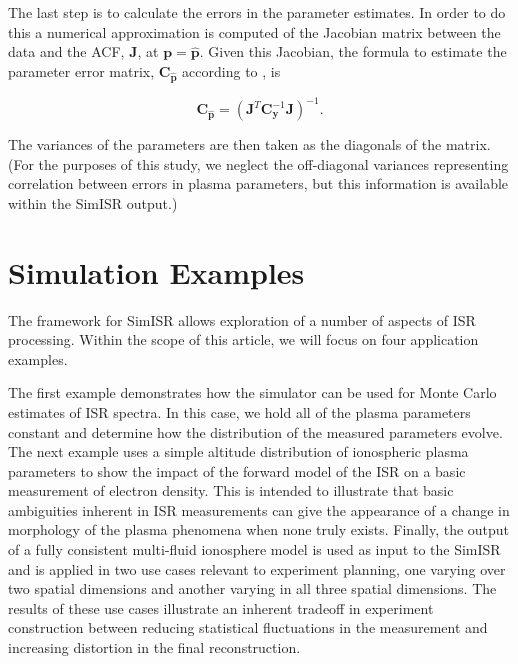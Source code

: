 \documentclass[draft,ras]{agutex}
\begin{document}
\begin{article}
The last step is to calculate the errors in the parameter estimates. In order to do this a numerical approximation is computed of the Jacobian matrix between the data and the ACF, $\mathbf{J}$, at $\mathbf{p}=\mathbf{\hat{p}}$. Given this Jacobian, the formula to estimate the parameter error matrix, $\mathbf{C}_{\mathbf{\hat{p}}}$ according to \citet{Hysell:2000cq}, is


\begin{equation}
\label{eqn:jacinv}
\mathbf{C}_{\mathbf{\hat{p}}}=(\mathbf{J}^T \mathbf{C}_{\mathbf{y}}^{-1}\mathbf{J})^{-1}.
\end{equation}


\noindent  The variances of the parameters are then taken as the diagonals of the matrix.  (For the purposes of this study, we neglect the off-diagonal variances representing correlation between errors in plasma parameters, but this information is available within the SimISR output.)




\section{Simulation Examples}
The framework for SimISR allows exploration of a number of aspects of ISR processing. Within the scope of this article, we will focus on four application examples.

The first example demonstrates how the simulator can be used for Monte Carlo estimates of ISR spectra. In this case, we hold all of the plasma parameters constant and determine how the distribution of the measured parameters evolve. The next example uses a simple altitude distribution of ionospheric plasma parameters to show the impact of the forward model of the ISR on a basic measurement of electron density. This is intended to illustrate that basic ambiguities inherent in ISR measurements can give the appearance of a change in morphology of the plasma phenomena when none truly exists. Finally, the output of a fully consistent multi-fluid ionosphere model is used as input to the SimISR and is applied in two use cases relevant to experiment planning, one varying over two spatial dimensions and another varying in all three spatial dimensions. The results of these use cases illustrate an inherent tradeoff in experiment construction between reducing statistical fluctuations in the measurement and increasing distortion in the final reconstruction. 


\end{article}
\end{document}
